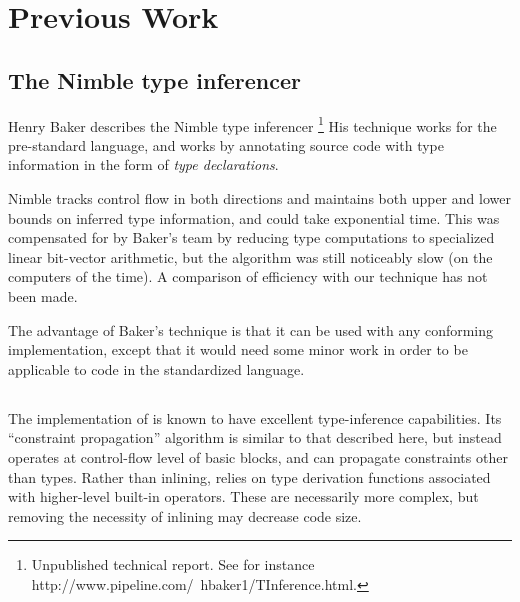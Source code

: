 \section{Previous Work}

\subsection{The Nimble type inferencer}

Henry Baker describes the Nimble type inferencer
\footnote{Unpublished technical report.  See for instance
  http://www.pipeline.com/~hbaker1/TInference.html.}  His technique
works for the pre-standard \commonlisp{} language, and works by
annotating source code with type information in the form of
\emph{type declarations}.

Nimble tracks control flow in both directions and maintains both
upper and lower bounds on inferred type information, and could take exponential time. This was compensated for by Baker's team by
reducing type computations to specialized linear bit-vector
arithmetic, but the algorithm was still noticeably slow (on the
computers of the time). A comparison of efficiency with our technique
has not been made.

The advantage of Baker's technique is that it can be used with any
conforming \commonlisp{} implementation, except that it would need some
minor work in order to be applicable to code in the standardized
language.

\subsection{\sbcl{}}

The \sbcl{} implementation of \commonlisp{} is known to have excellent
type-inference capabilities. Its ``constraint propagation'' algorithm
is similar to that described here, but instead operates at control-flow
level of basic blocks, and can propagate constraints other than types.
Rather than inlining, \sbcl{} relies on type derivation functions
associated with higher-level built-in operators. These are necessarily
more complex, but removing the necessity of inlining may decrease
code size.
